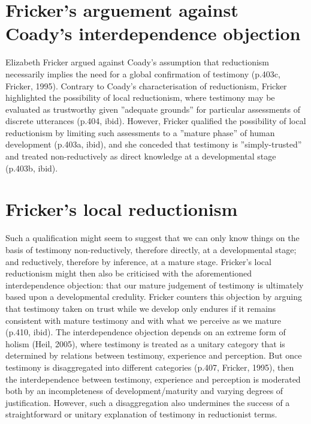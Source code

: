 \documentclass[a4paper, 11pt]{article} %
\begin{document}
\section*{Fricker's arguement against Coady's interdependence objection}

Elizabeth Fricker argued against Coady's assumption that reductionism necessarily implies the need for a global confirmation of testimony (p.403c, Fricker, 1995)\cite{Fricker:1995}. Contrary to Coady's characterisation of reductionism, Fricker highlighted the possibility of local reductionism,  where testimony may be evaluated as trustworthy given ''adequate grounds'' for particular assessments of discrete utterances (p.404, ibid)\cite{Fricker:1995}. However, Fricker qualified the possibility of local reductionism by limiting such assessments to a ''mature phase'' of human development (p.403a, ibid)\cite{Fricker:1995}, and she conceded that testimony is ''simply-trusted'' and treated non-reductively as direct knowledge at a developmental stage (p.403b, ibid)\cite{Fricker:1995}.

\section*{Fricker's local reductionism}

Such a qualification might seem to suggest that we can only know things on the basis of testimony non-reductively, therefore directly, at a developmental stage; and reductively, therefore by inference, at a mature stage. Fricker's local reductionism might then also be criticised with the aforementioned interdependence objection: that our mature judgement of testimony is ultimately based upon a developmental credulity. Fricker counters this objection by arguing that testimony taken on trust while we develop only endures if it remains consistent with mature testimony and with what we perceive as we mature (p.410, ibid)\cite{Fricker:1995}. The interdependence objection depends on an extreme form of holism (Heil, 2005)\cite{Heil:2005}, where testimony is treated as a unitary category that is determined by relations between testimony, experience and perception. But once testimony is disaggregated into different categories (p.407, Fricker, 1995)\cite{Fricker:1995}, then the interdependence between testimony, experience and perception is moderated both by an incompleteness of development/maturity and varying degrees of justification. However, such a disaggregation also undermines the success of a straightforward or unitary explanation of testimony in reductionist terms.
\end{document}

